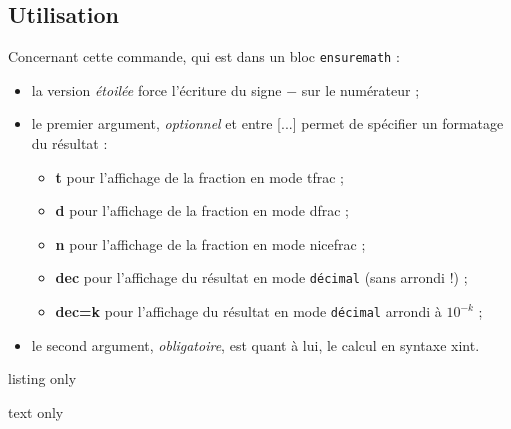\documentclass[french,a4paper,11pt]{article}
\newcommand\Cle[1]{{\bfseries\sffamily\textlangle #1\textrangle}}
\newcommand\cmaj[1]{\tcbox[vignetteMaJ]{#1}\xspace}
\begin{document}
\subsection{Utilisation}

\begin{tipblock}
Concernant cette commande, qui est dans un bloc \texttt{ensuremath} :

\begin{itemize}
	\item \cmaj{0.1.3} la version \textit{étoilée} force l'écriture du signe \og $-$ \fg{} sur le numérateur ;
	\item le premier argument, \textit{optionnel} et entre \textsf{[...]} permet de spécifier un formatage du résultat :
	\begin{itemize}
		\item \Cle{t} pour l'affichage de la fraction en mode \textsf{tfrac} ;
		\item \Cle{d} pour l'affichage de la fraction en mode \textsf{dfrac} ;
		\item \Cle{n} pour l'affichage de la fraction en mode \textsf{nicefrac} ;
		\item \Cle{dec} pour l'affichage du résultat en mode \texttt{décimal} (sans arrondi !) ;
		\item \Cle{dec=k} pour l'affichage du résultat en mode \texttt{décimal} arrondi à $10^{-k}$ ;
	\end{itemize}
	\item le second argument, \textit{obligatoire}, est quant à lui, le calcul en syntaxe \textsf{xint}.
\end{itemize}
\vspace*{-\baselineskip}\leavevmode
\end{tipblock}

\begin{PresentationCode}{listing only}
\end{PresentationCode}

\begin{PresentationCode}{text only}
\hfill{} \qquad
{} \qquad
{} \qquad
{} \qquad
{} \qquad
{}\hfill~
\end{PresentationCode}
\end{document}
